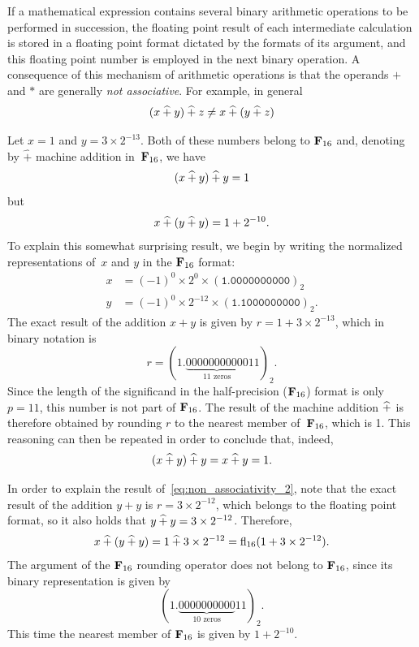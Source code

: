 If a mathematical expression contains several binary arithmetic operations to be performed in succession,
the floating point result of each intermediate calculation is stored in a floating point format dictated by the formats of its argument,
and this floating point number is employed in the next binary operation.
A consequence of this mechanism of arithmetic operations is that the operands $+$ and $*$ are generally \emph{not associative}.
For example, in general
\[
    (x \mathbin{\widehat +} y) \mathbin{\widehat +}  z \neq x \mathbin{\widehat +} (y \mathbin{\widehat +} z)
\]
\begin{example}
    Let $x = 1$ and $y = 3 \times 2^{-13}$.
    Both of these numbers belong to $\mathbf F_{16}$ and,
    denoting by $\widehat +$ machine addition in~$\mathbf F_{16}$,
    we have
    \begin{equation}
        \label{eq:non_associativity_1}
        (x \mathbin{\widehat +} y) \mathbin{\widehat +} y = 1
    \end{equation}
    but
    \begin{equation}
        \label{eq:non_associativity_2}
        x \mathbin{\widehat +} (y \mathbin{\widehat +} y) = 1 + 2^{-10}.
    \end{equation}
    To explain this somewhat surprising result,
    we begin by writing the normalized representations of~$x$ and $y$ in the $\mathbf F_{16}$ format:
    \begin{align*}
        x &= (-1)^0 \times 2^0 \times (\texttt{1.0000000000})_2 \\
        y &= (-1)^0 \times 2^{-12} \times (\texttt{1.1000000000})_2.
    \end{align*}
    The exact result of the addition $x + y$ is given by $r = 1 + 3 \times 2^{-13}$,
    which in binary notation is
    \[
        r = (1.\underbrace{00000000000}_{\text{11 zeros}}11)_2.
    \]
    Since the length of the significand in the half-precision ($\mathbf F_{16}$) format is only $p = 11$,
    this number is not part of $\mathbf F_{16}$.
    The result of the machine addition $\mathbin{\widehat +}$ is therefore obtained by rounding $r$ to the nearest member of~$\mathbf F_{16}$,
    which is 1.
    This reasoning can then be repeated in order to conclude that, indeed,
    \[
        (x \mathbin{\widehat +} y) \mathbin{\widehat +} y = x \mathbin{\widehat +} y = 1.
    \]

    In order to explain the result of~\eqref{eq:non_associativity_2},
    note that the exact result of the addition $y + y$ is $r = 3 \times 2^{-12}$,
    which belongs to the floating point format,
    so it also holds that $y \mathbin{\widehat +} y = 3 \times 2^{-12}$.
    Therefore,
    \[
        x \mathbin{\widehat +} (y \mathbin{\widehat +} y) = 1 \mathbin{\widehat +} 3 \times 2^{-12} = {\rm fl}_{16} (1 + 3 \times 2^{-12}).
    \]
    The argument of the $\mathbf F_{16}$ rounding operator does not belong to $\mathbf F_{16}$,
    since its binary representation is given by
    \[
        (1.\underbrace{0000000000}_{\text{10 zeros}}11)_2.
    \]
    This time the nearest member of $\mathbf F_{16}$ is given by $1 + 2^{-10}$.
\end{example}

